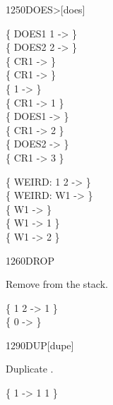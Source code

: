 \begin{worddef}[DOES]{1250}{DOES>}[does]
\begin{defer}
	\testing
		\{ \word{:} DOES1   1 \word{+} \word{;} -> \} \\
		\{ \word{:} DOES2   2 \word{+} \word{;} -> \} \\
		\{  CR1 -> \} \\
		\{ CR1 ->   \} \\
		\{ 1 \word{,} -> \} \\
		\{ CR1  -> 1 \} \\
		\{ DOES1 -> \} \\
		\{ CR1 -> 2 \} \\
		\{ DOES2 -> \} \\
		\{ CR1 -> 3 \}

		\{ \word{:} WEIRD:   1 \word{+}  2 \word{+} \word{;} -> \} \\
		\{ WEIRD: W1 -> \} \\
		\{  W1  ->  \} \\
		\{ W1 ->  1 \word{+} \} \\
		\{ W1 ->  2 \word{+} \}
	\end{defer}
\end{worddef}


\begin{worddef}{1260}{DROP}
\item {}

	Remove  from the stack.

	\begin{defer}
	\testing
		\{ 1 2  -> 1 \} \\
		\{ 0    ->   \}
	\end{defer}
\end{worddef}


\begin{worddef}{1290}{DUP}[dupe]
\item {}

	Duplicate \param{x}.

	\begin{defer}
	\testing
		\{ 1  -> 1 1 \}
	\end{defer}
\end{worddef}


